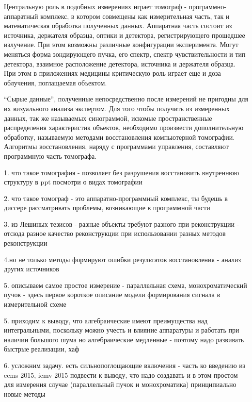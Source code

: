 Центральную роль в подобных измерениях играет томограф - программно-аппаратный комплекс, в котором совмещены как измерительная часть, так и математическая обработка полученных данных.
Аппаратная часть состоит из источника, держателя образца, оптики и детектора, регистрирующего прошедшее излучение. 
При этом возможны различные конфигурации эксперимента. 
Могут меняться форма зондирующего пучка, его спектр, спектр чувствительности и тип детектора, взаимное расположение детектора, источника и держателя образца.
При этом в приложениях медицины критическую роль играет еще и доза облучения, поглащаемая объектом.

``Сырые данные'', полученные непосредственно после измерений не пригодны для их визуального анализа экспертом.
Для того чтобы получить из измеренных данных, так же называемых синограммой, искомые пространственные распределения характеристик объектов, необходимо произвести дополнительную обработку, называемую методами восстановления компьютерной томографии.
Алгоритмы восстановления, наряду с программами управления, составляют программную часть томографа.


1. что такое томография - позволяет без разрушения восстановить внутреннюю структуру в ppt посмотри о видах томографии	

2. что такое томограф - это аппаратно-программный комплекс, ты будешь в диссере рассматривать проблемы, возникающие в программной части

3. из Лешиных тезисов - разные объекты требуют разного при реконструкции - отсюда разное качество реконструкции при использовании разных методов реконструкции

4.но не только методы формируют ошибки результатов восстановления - анализ других источников

5. описываем самое простое измерение - параллельная схема, монохроматический пучок - здесь первое короткое описание модели формирования сигнала в измерительной схеме

5. приходим к выводу, что алгебраические имеют преимущества над интегральными, поскольку можно учесть и влияние аппаратуры и работать при наличии большого шума
но алгебраические медленные - поэтому надо развивать быстрые реализации, хаф

6. усложним задачу. есть сильнопоглощающие включения - часть ко введению из ecms 2015, icmv 2015 подвести к выводу, что надо создавать и в этом простом для измерения случае (параллельный пучок и монохроматика) принципиально новые методы

